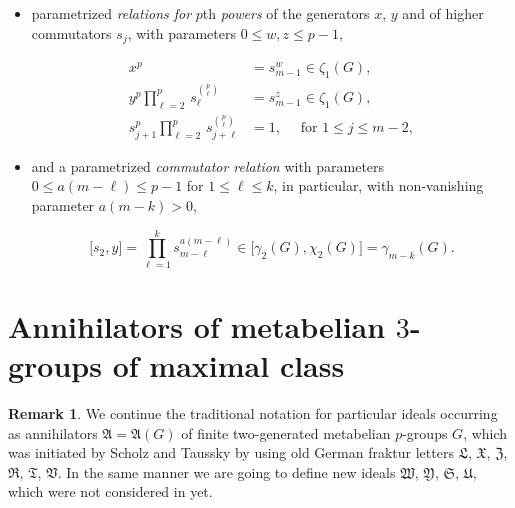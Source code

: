 \documentclass{amsart}
\theoremstyle{definition}
\newtheorem{remark}{Remark}[section]
\numberwithin{equation}{section}
\begin{document}
\begin{itemize}

\item
parametrized \textit{relations for} \(p\)th \textit{powers} of the generators \(x\), \(y\) and of higher commutators \(s_j\),
with parameters \(0\le w,z\le p-1\),

\begin{equation}
\label{eqn:PowerRelMaxP}
\begin{aligned}
x^p                                                     &= s_{m-1}^w\in\zeta_1(G), \\
y^p\prod_{\ell=2}^p\,s_\ell^{\binom{p}{\ell}}           &= s_{m-1}^z\in\zeta_1(G), \\
s_{j+1}^p\prod_{\ell=2}^p\,s_{j+\ell}^{\binom{p}{\ell}} &= 1, \quad \text{ for } 1\le j\le m-2,
\end{aligned}
\end{equation}

\item
 and a parametrized \textit{commutator relation} with parameters \(0\le a(m-\ell)\le p-1\) for \(1\le\ell\le k\),
 in particular, with non-vanishing parameter \(a(m-k)>0\),

\begin{equation}
\label{eqn:CommutatorRelMaxP}
\lbrack s_2,y\rbrack=\prod_{\ell=1}^k s_{m-\ell}^{a(m-\ell)}\in\lbrack\gamma_2(G),\chi_2(G)\rbrack=\gamma_{m-k}(G).
\end{equation}

\end{itemize}



\section{Annihilators of metabelian \(3\)-groups of maximal class}
\label{s:MaxSmbOrd3}

\begin{remark}
\label{rmk:MaxSmbOrd3}
We continue the traditional notation for particular ideals
occurring as annihilators \(\mathfrak{A}=\mathfrak{A}(G)\) of finite two-generated metabelian \(p\)-groups \(G\),
which was initiated by Scholz and Taussky
\cite{SoTa}
by using old German fraktur letters
\(\mathfrak{L}\), \(\mathfrak{X}\), \(\mathfrak{Z}\), \(\mathfrak{R}\), \(\mathfrak{T}\), \(\mathfrak{V}\).
In the same manner we are going to define new ideals
\(\mathfrak{W}\), \(\mathfrak{Y}\), \(\mathfrak{S}\), \(\mathfrak{U}\),
which were not considered in
\cite{SoTa}
yet. 
\end{remark}
\end{document}
